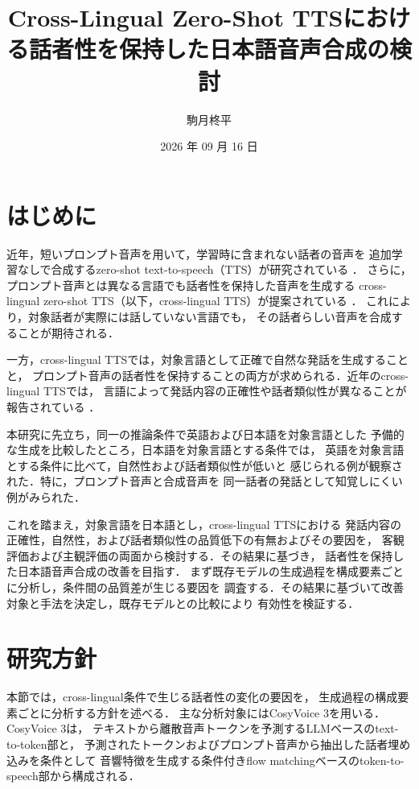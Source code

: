 \documentclass[twocolumn, a4paper]{UECIEresume}
\title{Cross-Lingual Zero-Shot TTSにおける話者性を保持した日本語音声合成の検討}
\date{2026 年 09 月 16 日}
\affiliation{I類 メディア情報学 プログラム}
\author{駒月柊平}
\begin{document}
\maketitle

\section{はじめに}

近年，短いプロンプト音声を用いて，学習時に含まれない話者の音声を
追加学習なしで合成するzero-shot text-to-speech（TTS）が研究されている
\cite{Wang2023VALLE}．
さらに，プロンプト音声とは異なる言語でも話者性を保持した音声を生成する
cross-lingual zero-shot TTS（以下，cross-lingual TTS）が提案されている
\cite{Zhang2023VALLEX}．
これにより，対象話者が実際には話していない言語でも，
その話者らしい音声を合成することが期待される．

一方，cross-lingual TTSでは，対象言語として正確で自然な発話を生成することと，
プロンプト音声の話者性を保持することの両方が求められる．近年のcross-lingual TTSでは，
言語によって発話内容の正確性や話者類似性が異なることが報告されている
\cite{Xu2026XVoice}．

本研究に先立ち，同一の推論条件で英語および日本語を対象言語とした
予備的な生成を比較したところ，日本語を対象言語とする条件では，
英語を対象言語とする条件に比べて，自然性および話者類似性が低いと
感じられる例が観察された．特に，プロンプト音声と合成音声を
同一話者の発話として知覚しにくい例がみられた．

これを踏まえ，対象言語を日本語とし，cross-lingual TTSにおける
発話内容の正確性，自然性，および話者類似性の品質低下の有無およびその要因を，
客観評価および主観評価の両面から検討する．その結果に基づき，
話者性を保持した日本語音声合成の改善を目指す．
まず既存モデルの生成過程を構成要素ごとに分析し，条件間の品質差が生じる要因を
調査する．その結果に基づいて改善対象と手法を決定し，既存モデルとの比較により
有効性を検証する．

\section{研究方針}

本節では，cross-lingual条件で生じる話者性の変化の要因を，
生成過程の構成要素ごとに分析する方針を述べる．
主な分析対象にはCosyVoice 3\cite{Du2025CosyVoice3}を用いる．CosyVoice 3は，
テキストから離散音声トークンを予測するLLMベースのtext-to-token部と，
予測されたトークンおよびプロンプト音声から抽出した話者埋め込みを条件として
音響特徴を生成する条件付きflow matchingベースのtoken-to-speech部から構成される．
\end{document}
